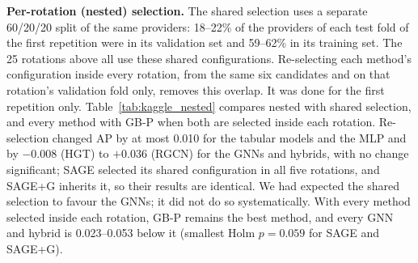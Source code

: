 \documentclass[pdflatex,sn-vancouver-num]{sn-jnl}
\begin{document}
\textbf{Per-rotation (nested) selection.} The shared selection uses a separate 60/20/20 split of the same providers:
18--22\% of the providers of each test fold of the first repetition were in its validation set and 59--62\% in its
training set. The 25 rotations above all use these shared configurations. Re-selecting each method's configuration inside every
rotation, from the same six candidates and on that rotation's validation fold only, removes this overlap.
It was done for the first repetition only. Table~\ref{tab:kaggle_nested} compares nested with shared selection,
and every method with GB-P when both are selected inside each rotation. Re-selection changed AP by at most 0.010 for the tabular models and the MLP and by
$-0.008$ (HGT) to $+0.036$ (RGCN) for the GNNs and hybrids, with no change significant; SAGE selected its shared
configuration in all five rotations, and SAGE+G inherits it, so their results are identical. We had expected the
shared selection to favour the GNNs; it did not do so systematically. With every method selected inside each
rotation, GB-P remains the best method, and every GNN and hybrid is 0.023--0.053 below it (smallest Holm $p=0.059$
for SAGE and SAGE+G).
\end{document}
